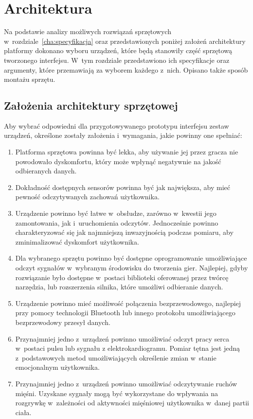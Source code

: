 \chapter{Architektura}
\label{cha:architektura}
Na podstawie analizy możliwych rozwiązań sprzętowych w~rozdziale~\ref{cha:specyfikacja} oraz przedstawionych poniżej założeń architektury platformy dokonano wyboru urządzeń, które będą stanowiły część sprzętową tworzonego interfejsu. W~tym rozdziale przedstawiono ich specyfikacje oraz argumenty, które przemawiają za wyborem każdego z~nich. Opisano także sposób montażu sprzętu.

\section{Założenia architektury sprzętowej}
Aby wybrać odpowiedni dla przygotowywanego prototypu interfejsu zestaw urządzeń, określone zostały założenia i~wymagania, jakie powinny one spełniać:
\begin{enumerate}
	\item Platforma sprzętowa powinna być lekka, aby używanie jej przez gracza nie powodowało dyskomfortu, który może wpłynąć negatywnie na jakość odbieranych danych.
	\item Dokładność dostępnych sensorów powinna być jak największa, aby mieć pewność odczytywanych zachowań użytkownika.
	\item Urządzenie powinno być łatwe w~obsłudze, zarówno w~kwestii jego zamontowania, jak i~uruchomienia odczytów. Jednocześnie powinno charakteryzować się jak najmniejszą inwazyjnością podczas pomiaru, aby zminimalizować dyskomfort użytkownika.
	\item Dla wybranego sprzętu powinno być dostępne oprogramowanie umożliwiające odczyt sygnałów w~wybranym środowisku do tworzenia gier. Najlepiej, gdyby rozwiązanie było dostępne w~postaci biblioteki oferowanej przez twórcę narzędzia, lub rozszerzenia silnika, które umożliwi odbieranie danych.
	\item Urządzenie powinno mieć możliwość połączenia bezprzewodowego, najlepiej przy pomocy technologii Bluetooth lub innego protokołu umożliwiającego bezprzewodowy przesył danych.
	\item Przynajmniej jedno z~urządzeń powinno umożliwiać odczyt pracy serca w~postaci pulsu lub sygnału z elektrokardiogramu. Pomiar tętna jest jedną z~podstawowych metod umożliwiających określenie zmian w~stanie emocjonalnym użytkownika.
	\item Przynajmniej jedno z~urządzeń powinno umożliwiać odczytywanie ruchów mięśni. Uzyskane sygnały mogą być wykorzystane do wpływania na rozgrywkę w~zależności od aktywności mięśniowej użytkownika w~danej partii ciała.
\end{enumerate}


